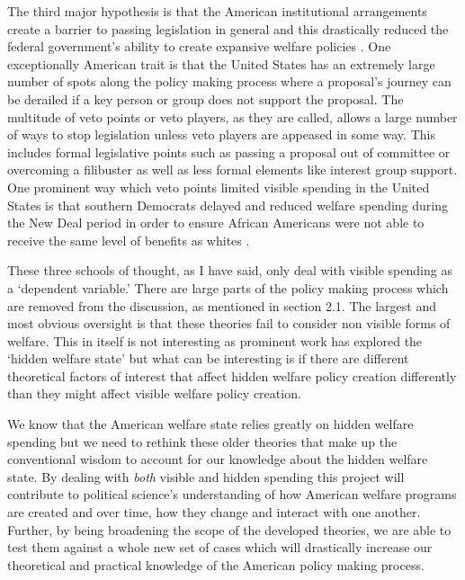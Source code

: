 \documentclass[12pt]{article}
\begin{document}
The third major hypothesis is that the American institutional arrangements create a barrier to passing legislation in general and this drastically reduced the federal government's ability to create expansive welfare policies \citep{pierson1995, robertson2011}. One exceptionally American trait is that the United States has an extremely large number of spots along the policy making process where a proposal's journey can be derailed if a key person or group does not support the proposal. The multitude of veto points or veto players, as they are called, allows a large number of ways to stop legislation unless veto players are appeased in some way. This includes formal legislative points such as passing a proposal out of committee or overcoming a filibuster as well as less formal elements like interest group support. One prominent way which veto points limited visible spending in the United States is that southern Democrats delayed and reduced welfare spending during the New Deal period in order to ensure African Americans were not able to receive the same level of benefits as whites \citep{katznelson2013}. 

These three schools of thought, as I have said, only deal with visible spending as a `dependent variable.' There are large parts of the policy making process which are removed from the discussion, as mentioned in section 2.1. The largest and most obvious oversight is that these theories fail to consider non visible forms of welfare. This in itself is not interesting as prominent work has explored the `hidden welfare state' but what can be interesting is if there are different theoretical factors of interest that affect hidden welfare policy creation differently than they might affect visible welfare policy creation.

We know that the American welfare state relies greatly on hidden welfare spending but we need to rethink these older theories that make up the conventional wisdom to account for our knowledge about the hidden welfare state. By dealing with \emph{both} visible and hidden spending this project will contribute to political science's understanding of how American welfare programs are created and over time, how they change and interact with one another.  Further, by being broadening the scope of the developed theories, we are able to test them against a whole new set of cases which will drastically increase our theoretical and practical knowledge of the American policy making process.
\end{document}
